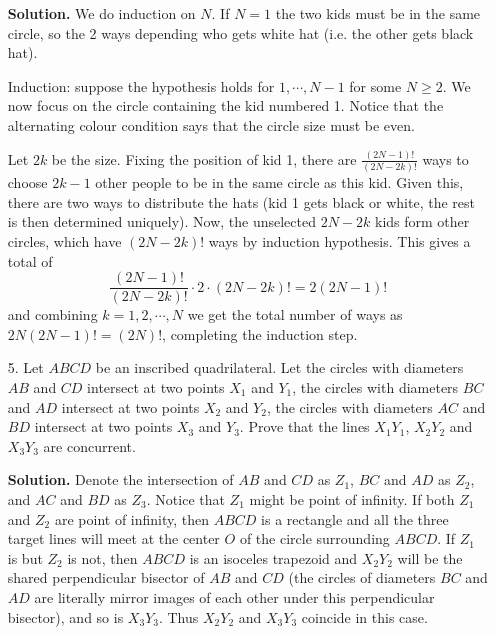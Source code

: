 \documentclass[11pt,a4paper]{article}
\begin{document}
\begin{enumerate}
	\textbf{Solution.} We do induction on $N$. If $N=1$ the two kids must be in the same circle, so the 2 ways depending who gets white hat (i.e. the other gets black hat). 
	
	Induction: suppose the hypothesis holds for $1, \cdots , N-1$ for some $N\ge 2$. We now focus on the circle containing the kid numbered 1. Notice that the alternating colour condition says that the circle size must be even. 
	
	Let $2k$ be the size. Fixing the position of kid 1, there are $\frac{(2N-1)!}{(2N-2k)!}$ ways to choose $2k-1$ other people to be in the same circle as this kid. Given this, there are two ways to distribute the hats (kid 1 gets black or white, the rest is then determined uniquely). 
	Now, the unselected $2N-2k$ kids form other circles, which have $(2N-2k)!$ ways by induction hypothesis. This gives a total of 
	\[
	\frac{(2N-1)!}{(2N-2k)!}\cdot 2\cdot (2N-2k)! = 2(2N-1)!
	\]
	and combining $k=1, 2, \cdots , N$ we get the total number of ways as $2N(2N-1)!=(2N)!$, completing the induction step. 
	
	\item[5.] Let $ABCD$ be an inscribed quadrilateral. Let the circles with diameters $AB$ and $CD$ intersect at two points $X_1$ and $Y_1$, the circles with diameters $BC$ and $AD$ intersect at two points $X_2$ and $Y_2$, the circles with diameters $AC$ and $BD$ intersect at two points $X_3$ and $Y_3$. Prove that the lines $X_1Y_1$, $X_2Y_2$ and $X_3Y_3$ are concurrent.
	
	\textbf{Solution.} Denote the intersection of $AB$ and $CD$ as $Z_1$, $BC$ and $AD$ as $Z_2$, and $AC$ and $BD$ as $Z_3$. Notice that $Z_1$ might be point of infinity. If both $Z_1$ and $Z_2$ are point of infinity, then $ABCD$ is a rectangle and all the three target lines will meet at the center $O$ of the circle surrounding $ABCD$. If $Z_1$ is but $Z_2$ is not, then $ABCD$ is an isoceles trapezoid and $X_2Y_2$ will be the shared perpendicular bisector of $AB$ and $CD$ (the circles of diameters $BC$ and $AD$ are literally mirror images of each other under this perpendicular bisector), and so is $X_3Y_3$. Thus $X_2Y_2$ and $X_3Y_3$ coincide in this case. 
	

\end{enumerate}
\end{document}
